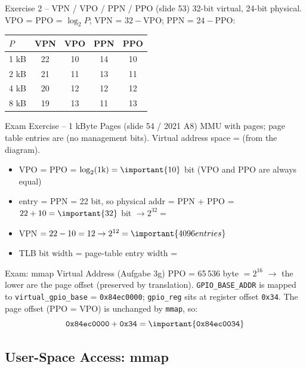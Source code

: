\begin{example2}{Exercise 2 -- VPN / VPO / PPN / PPO (slide 53)}
    32-bit virtual, 24-bit physical. VPO = PPO = $\log_2 P$; VPN = $32-$VPO;
    PPN = $24-$PPO:
    \tcblower
    \begin{tabular}{l|c|c|c|c}
        $P$ & VPN & VPO & PPN & PPO \\\hline
        1 kB & 22 & 10 & 14 & 10 \\
        2 kB & 21 & 11 & 13 & 11 \\
        4 kB & 20 & 12 & 12 & 12 \\
        8 kB & 19 & 13 & 11 & 13 \\
    \end{tabular}
\end{example2}

\begin{example2}{Exam Exercise -- 1 kByte Pages (slide 54 / 2021 A8)}
    MMU with  pages; page table entries are 
    (no management bits). Virtual address space =  (from the diagram).
    \tcblower
    \begin{itemize}
        \item {} VPO = PPO = $\log_2(1\text{k}) = \important{10}$ bit
              (VPO and PPO are always equal)
        \item {} entry = PPN = 22 bit, so physical addr = PPN + PPO =
              $22+10 = \important{32}$ bit $\to 2^{32} = $ 
        \item {} VPN $= 22-10 = 12 \to 2^{12} = \important{4096 entries}$
        \item {} TLB bit width = page-table entry width = 
    \end{itemize}
\end{example2}

\begin{example2}{Exam: mmap Virtual Address (Aufgabe 3g)}
    PPO = 65\,536 byte $= 2^{16}$ $\to$ the lower  are the page
    offset (preserved by translation). \texttt{GPIO\_BASE\_ADDR} is mapped to
    \texttt{virtual\_gpio\_base} = \texttt{0x84ec0000}; \texttt{gpio\_reg} sits at
    register offset \texttt{0x34}.
    \tcblower
    The page offset (PPO = VPO) is unchanged by \texttt{mmap}, so:
    $$\texttt{0x84ec0000} + \texttt{0x34} = \important{\texttt{0x84ec0034}}$$
\end{example2}

\subsection{User-Space Access: mmap}


